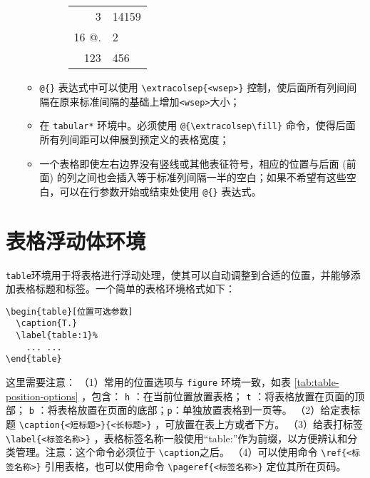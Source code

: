 \begin{enumerate}
\begin{itemize}
\begin{figure}[!hpbt]
\begin{minipage}{0.5\textwidth}
        \end{minipage}
        \begin{minipage}{0.45\textwidth}
        \centering
        \begin{tabular}{rl}
        3   & 14159 \\
        16  @{.\hspace{\fill}}& 2     \\
        123 & 456   \\
        \end{tabular}
        \end{minipage}
        \end{figure}
        \item \verb|@{}| 表达式中可以使用 \verb|\extracolsep{<wsep>}| 控制，使后面所有列间间隔在原来标准间隔的基础上增加\verb|<wsep>|大小；
        \item 在 \verb|tabular*| 环境中。必须使用 \verb|@{\extracolsep\fill}| 命令，使得后面所有列间距可以伸展到预定义的表格宽度；
        \item 一个表格即使左右边界没有竖线或其他表征符号，相应的位置与后面 (前面) 的列之间也会插入等于标准列间隔一半的空白；如果不希望有这些空白，可以在行参数开始或结束处使用 \verb|@{}| 表达式。
    \end{itemize}
\end{enumerate}


\section{表格浮动体环境}
\texttt{table}环境用于将表格进行浮动处理，使其可以自动调整到合适的位置，并能够添加表格标题和标签。一个简单的表格环境格式如下：
\begin{verbatim}
\begin{table}[位置可选参数]
  \caption{T.}
  \label{table:1}%
    ... ...
\end{table}
\end{verbatim}
这里需要注意：
（1）常用的位置选项与 \verb|figure| 环境一致，如表 \ref{tab:table-position-options} ，包含： \verb|h| ：在当前位置放置表格； \verb|t| ：将表格放置在页面的顶部； \verb|b| ：将表格放置在页面的底部；\verb|p|：单独放置表格到一页等。
（2）给定表标题 \verb|\caption{<短标题>}{<长标题>}| ，可放置在表上方或者下方。
（3）给表打标签 \verb|\label{<标签名称>}| ，表格标签名称一般使用“table:”作为前缀，以方便辨认和分类管理。注意：这个命令必须位于 \verb|\caption|之后。
（4）可以使用命令  \verb|\ref{<标签名称>}| 引用表格，也可以使用命令 \verb|\pageref{<标签名称>}| 定位其所在页码。


